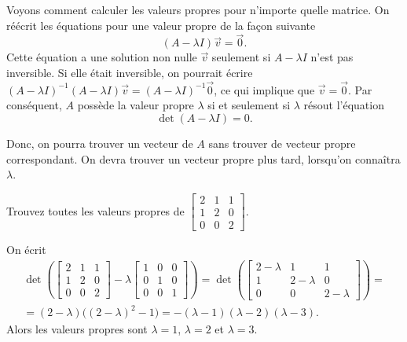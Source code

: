 Voyons comment calculer les valeurs propres pour n’importe quelle matrice. On réécrit les équations pour une valeur propre de la façon suivante
\begin{equation*}
(A - \lambda I)\vec{v} = \vec{0} .
\end{equation*}
Cette équation a une solution non nulle $\vec{v}$ seulement si 
$A - \lambda I$ n’est pas inversible. Si elle était inversible, on pourrait écrire
${(A - \lambda I)}^{-1}(A - \lambda I)\vec{v} = {(A-\lambda I)}^{-1}\vec{0}$,
ce qui implique que $\vec{v} = \vec{0}$.  Par conséquent,
$A$ possède la valeur propre $\lambda$ si et seulement si $\lambda$ résout l'équation
\begin{equation*}
\det (A-\lambda I) = 0 .
\end{equation*}

Donc, on pourra trouver un vecteur de $A$ sans trouver de vecteur propre correspondant. On devra trouver un vecteur propre plus tard, lorsqu’on connaîtra $\lambda$.

\begin{example}
Trouvez toutes les valeurs propres de
$\left[ \begin{smallmatrix}
2 & 1 & 1 \\
1 & 2 & 0 \\
0 & 0 & 2
\end{smallmatrix} \right]$.

On écrit
\begin{multline*}
\det \left(
\begin{bmatrix}
2 & 1 & 1 \\
1 & 2 & 0 \\
0 & 0 & 2
\end{bmatrix}
- \lambda 
\begin{bmatrix}
1 & 0 & 0 \\
0 & 1 & 0 \\
0 & 0 & 1
\end{bmatrix}
\right)
=
\det \left(
\begin{bmatrix}
2-\lambda & 1 & 1 \\
1 & 2-\lambda & 0 \\
0 & 0 & 2-\lambda
\end{bmatrix}
\right)
= \\
=
(2-\lambda) \bigl({(2-\lambda)}^2 - 1\bigr)
= 
-(\lambda -1)(\lambda -2)(\lambda-3) .
\end{multline*}
Alors les valeurs propres sont $\lambda = 1$, $\lambda = 2$ et
$\lambda = 3$.
\end{example}

